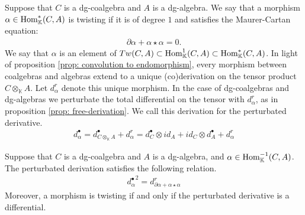\documentclass[../thesis.tex]{subfiles}
\begin{document}
            Suppose that $C$ is a dg-coalgebra and $A$ is a dg-algebra. We say that a morphism $\alpha\in \tt{Hom}_\mathbb{K}^*(C,A)$ is twisting if it is of degree $1$ and satisfies the Maurer-Cartan equation:
            \begin{align*}
                \partial\alpha + \alpha\star\alpha = 0\text{.}
            \end{align*}
            We say that $\alpha$ is an element of $Tw(C,A)\subset \tt{Hom}_\mathbb{K}^{1}(C,A)\subset \tt{Hom}_\mathbb{K}^*(C,A)$. In light of proposition \ref{prop: convolution to endomorphism}, every morphism between coalgebras and algebras extend to a unique (co)derivation on the tensor product $C\otimes_\mathbb{K}A$. Let $d_\alpha^r$ denote this unique morphism. In the case of dg-coalgebras and dg-algebras we perturbate the total differential on the tensor with $d_\alpha^r$, as in proposition \ref{prop: free-derivation}. We call this derivation for the perturbated derivative.
            \begin{align*}
                d_\alpha^\bullet = d_{C\otimes_\mathbb{K}A}^\bullet + d_\alpha^r = d_C^\bullet\otimes id_A + id_C\otimes d_A^\bullet + d_\alpha^r
            \end{align*}
            \begin{proposition}\label{prop: twisted-differential}
                Suppose that $C$ is a dg-coalgebra and $A$ is a dg-algebra, and $\alpha\in \tt{Hom}_\mathbb{K}^{-1}(C,A)$. The perturbated derivation satisfies the following relation.
                \begin{align*}
                    {d^\bullet_\alpha}^2 = d^r_{\partial \alpha + \alpha\star\alpha}
                \end{align*}
                Moreover, a morphism is twisting if and only if the perturbated derivative is a differential.
            \end{proposition}
\end{document}
